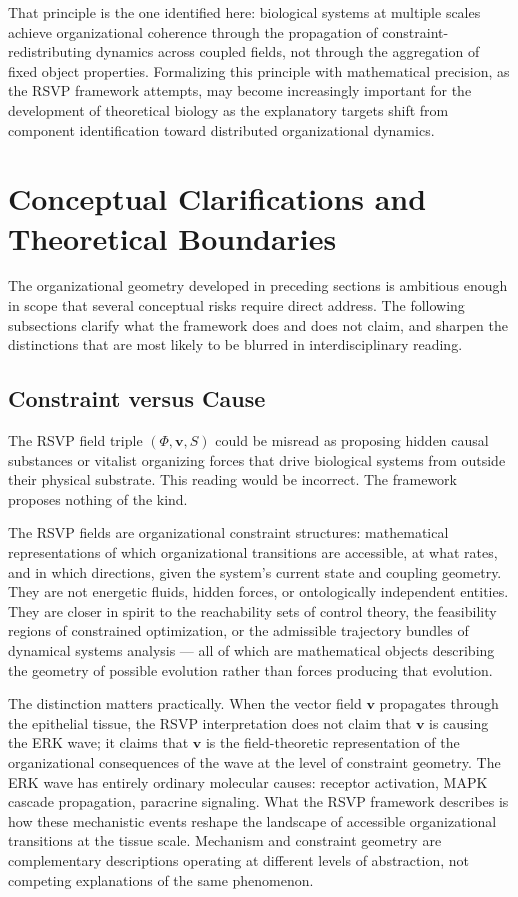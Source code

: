 \documentclass[11pt,a4paper]{article}
\theoremstyle{plain}
\theoremstyle{definition}
\begin{document}
That principle is the one identified here: biological systems at multiple scales achieve
organizational coherence through the propagation of constraint-redistributing dynamics
across coupled fields, not through the aggregation of fixed object properties. Formalizing
this principle with mathematical precision, as the RSVP framework attempts, may become
increasingly important for the development of theoretical biology as the explanatory
targets shift from component identification toward distributed organizational dynamics.

\section{Conceptual Clarifications and Theoretical Boundaries}
\label{sec:clarifications}

The organizational geometry developed in preceding sections is ambitious enough in
scope that several conceptual risks require direct address. The following subsections
clarify what the framework does and does not claim, and sharpen the distinctions that
are most likely to be blurred in interdisciplinary reading.

\subsection{Constraint versus Cause}

The RSVP field triple $(\Phi, \mathbf{v}, S)$ could be misread as proposing hidden
causal substances or vitalist organizing forces that drive biological systems from
outside their physical substrate. This reading would be incorrect. The framework
proposes nothing of the kind.

The RSVP fields are organizational constraint structures: mathematical representations
of which organizational transitions are accessible, at what rates, and in which
directions, given the system's current state and coupling geometry. They are not
energetic fluids, hidden forces, or ontologically independent entities. They are
closer in spirit to the reachability sets of control theory, the feasibility regions
of constrained optimization, or the admissible trajectory bundles of dynamical
systems analysis --- all of which are mathematical objects describing the geometry
of possible evolution rather than forces producing that evolution.

The distinction matters practically. When the vector field $\mathbf{v}$ propagates
through the epithelial tissue, the RSVP interpretation does not claim that $\mathbf{v}$
is causing the ERK wave; it claims that $\mathbf{v}$ is the field-theoretic
representation of the organizational consequences of the wave at the level of
constraint geometry. The ERK wave has entirely ordinary molecular causes: receptor
activation, MAPK cascade propagation, paracrine signaling. What the RSVP framework
describes is how these mechanistic events reshape the landscape of accessible
organizational transitions at the tissue scale. Mechanism and constraint geometry
are complementary descriptions operating at different levels of abstraction, not
competing explanations of the same phenomenon.
\end{document}
